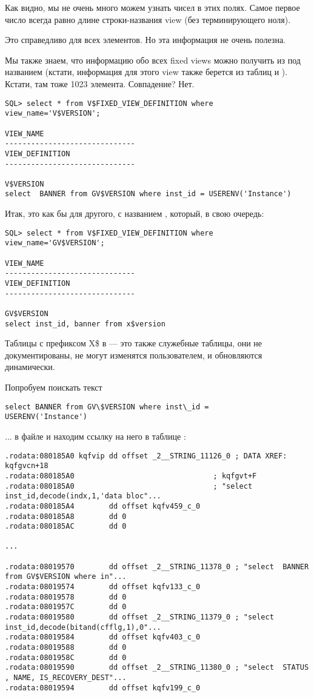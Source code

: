 Как видно, мы не очень много можем узнать чисел в этих полях. Самое первое число всегда равно длине строки-названия view (без терминирующего ноля).

Это справедливо для всех элементов. Но эта информация не очень полезна.

Мы также знаем, что информацию обо всех fixed views можно получить из  под названием
(кстати, информация для этого view также берется из таблиц  и ).
Кстати, там тоже 1023 элемента. Совпадение? Нет.

\begin{lstlisting}
SQL> select * from V$FIXED_VIEW_DEFINITION where view_name='V$VERSION';

VIEW_NAME
------------------------------
VIEW_DEFINITION
------------------------------

V$VERSION
select  BANNER from GV$VERSION where inst_id = USERENV('Instance')
\end{lstlisting}

Итак,  это как бы  для другого, с названием , который, в свою очередь:

\begin{lstlisting}
SQL> select * from V$FIXED_VIEW_DEFINITION where view_name='GV$VERSION';

VIEW_NAME
------------------------------
VIEW_DEFINITION
------------------------------

GV$VERSION
select inst_id, banner from x$version
\end{lstlisting}

Таблицы с префиксом X\$ в \oracle --- это также служебные таблицы, они не документированы,
не могут изменятся пользователем, и обновляются динамически.

Попробуем поискать текст \\
\begin{lstlisting}
select BANNER from GV\$VERSION where inst\_id = 
USERENV('Instance')
\end{lstlisting}
... в файле  и находим ссылку на него в таблице :

\begin{lstlisting}[caption=kqf.o]
.rodata:080185A0 kqfvip dd offset _2__STRING_11126_0 ; DATA XREF: kqfgvcn+18
.rodata:080185A0                                ; kqfgvt+F
.rodata:080185A0                                ; "select inst_id,decode(indx,1,'data bloc"...
.rodata:080185A4        dd offset kqfv459_c_0
.rodata:080185A8        dd 0
.rodata:080185AC        dd 0

...

.rodata:08019570        dd offset _2__STRING_11378_0 ; "select  BANNER from GV$VERSION where in"...
.rodata:08019574        dd offset kqfv133_c_0
.rodata:08019578        dd 0
.rodata:0801957C        dd 0
.rodata:08019580        dd offset _2__STRING_11379_0 ; "select inst_id,decode(bitand(cfflg,1),0"...
.rodata:08019584        dd offset kqfv403_c_0
.rodata:08019588        dd 0
.rodata:0801958C        dd 0
.rodata:08019590        dd offset _2__STRING_11380_0 ; "select  STATUS , NAME, IS_RECOVERY_DEST"...
.rodata:08019594        dd offset kqfv199_c_0
\end{lstlisting}

